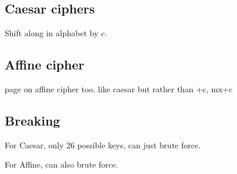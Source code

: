 
\subsection{Caesar ciphers}

Shift along in alphabet by \(c\).

\subsection{Affine cipher}

page on affine cipher too. like caesar but rather than +c, mx+c

\subsection{Breaking}


For Caesar, only 26 possible keys, can just brute force.

For Affine, can also brute force.
